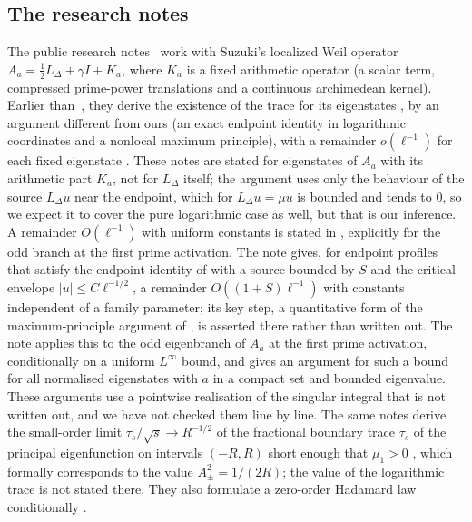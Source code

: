 \documentclass[11pt]{amsart}
\newcommand{\LD}{L_\Delta}
\theoremstyle{definition}
\theoremstyle{remark}
\numberwithin{equation}{section}
\begin{document}
\subsection*{The research notes \texorpdfstring{\cite{Mathia26}}{[Mathia26]}}
The public research notes~\cite{Mathia26} work with Suzuki's localized Weil operator $A_a=\frac12\LD+\gamma I+K_a$, where $K_a$ is a fixed arithmetic operator (a scalar term, compressed prime-power translations and a continuous archimedean kernel). Earlier than~\cite{BT26}, they derive the existence of the trace for its eigenstates \cite[PL-319--PL-323]{Mathia26}, by an argument different from ours (an exact endpoint identity in logarithmic coordinates and a nonlocal maximum principle), with a remainder $o(\ell^{-1})$ for each fixed eigenstate \cite[PL-323]{Mathia26}. These notes are stated for eigenstates of $A_a$ with its arithmetic part $K_a$, not for $\LD$ itself; the argument uses only the behaviour of the source $\LD u$ near the endpoint, which for $\LD u=\mu u$ is bounded and tends to $0$, so we expect it to cover the pure logarithmic case as well, but that is our inference. A remainder $O(\ell^{-1})$ with uniform constants is stated in \cite[PL-329, PL-336, PL-337]{Mathia26}, explicitly for the odd branch at the first prime activation. The note \cite[PL-329]{Mathia26} gives, for endpoint profiles that satisfy the endpoint identity of \cite[PL-319]{Mathia26} with a source bounded by $S$ and the critical envelope $|u|\le C\ell^{-1/2}$, a remainder $O((1+S)\ell^{-1})$ with constants independent of a family parameter; its key step, a quantitative form of the maximum-principle argument of \cite[PL-323]{Mathia26}, is asserted there rather than written out. The note \cite[PL-336]{Mathia26} applies this to the odd eigenbranch of $A_a$ at the first prime activation, conditionally on a uniform $L^\infty$ bound, and \cite[PL-337]{Mathia26} gives an argument for such a bound for all normalised eigenstates with $a$ in a compact set and bounded eigenvalue. These arguments use a pointwise realisation of the singular integral that is not written out, and we have not checked them line by line. The same notes derive the small-order limit $\tau_s/\sqrt s\to R^{-1/2}$ of the fractional boundary trace $\tau_s$ of the principal eigenfunction on intervals $(-R,R)$ short enough that $\mu_1>0$ \cite[PL-297]{Mathia26}, which formally corresponds to the value $A_\pm^2=1/(2R)$; the value of the logarithmic trace is not stated there. They also formulate a zero-order Hadamard law conditionally \cite[PL-306]{Mathia26}.
\end{document}
